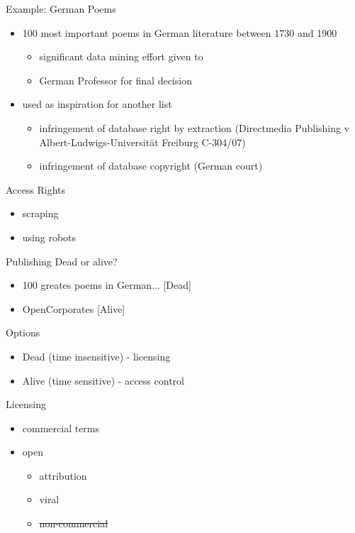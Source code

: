 \documentclass{beamer}
\begin{document}
\begin{frame}{Example: German Poems}
  \begin{itemize}
  \item 100 most important poems in German literature between
1730 and 1900
\begin{itemize}
\item significant data mining effort given to
\item German Professor for final decision
\end{itemize}
\item used as inspiration for another list
  \begin{itemize}
  \item infringement of database right by extraction (Directmedia Publishing v
  Albert-Ludwigs-Universität Freiburg C-304/07)
\item infringement of database copyright (German court)
  \end{itemize}
  \end{itemize}
\end{frame}

\begin{frame}{Access Rights}
  \begin{itemize}
  \item scraping
  \item using robots
  \end{itemize}
\end{frame}

\begin{frame}{Publishing}
Dead or alive?
\begin{itemize}
\item 100 greates poems in German... [Dead]
\item OpenCorporates [Alive]
\end{itemize}
Options
\begin{itemize}
\item Dead (time insensitive) - licensing
\item Alive (time sensitive) - access control
\end{itemize}
  
\end{frame}

\begin{frame}{Licensing}
  \begin{itemize}
  \item commercial terms
  \item open
    \begin{itemize}
    \item attribution
    \item viral
    \item \sout{non-commercial}
    \end{itemize}
  \end{itemize}
\end{frame}
\end{document}
